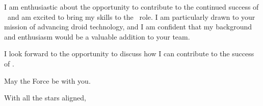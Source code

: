 \documentclass[10pt, a4paper]{article}
\begin{document}
I am enthusiastic about the opportunity to contribute to the continued success of \COMPANY\ and am excited to bring my skills to the \ROLE\ role. I am particularly drawn to your mission of advancing droid technology, and I am confident that my background and enthusiasm would be a valuable addition to your team.

I look forward to the opportunity to discuss how I can contribute to the success of \COMPANY.

\bigskip

May the Force be with you.

With all the stars aligned,
\vspace{10pt}

\name
\end{document}
